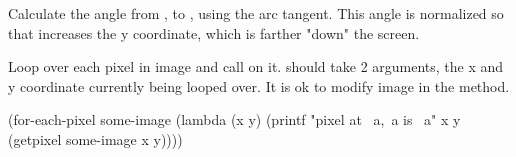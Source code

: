 Calculate the angle from , to , using the arc tangent. This angle is normalized so that  increases the y coordinate, which is farther "down" the screen.


Loop over each pixel in image and call  on it.  should take 2 arguments, the x and y coordinate currently being looped over. It is ok to modify image in the  method.

\begin{schemedisplay}
(for-each-pixel some-image
  (lambda (x y)
    (printf "pixel at ~a,~a is ~a\n" x y (getpixel some-image x y))))
\end{schemedisplay}
